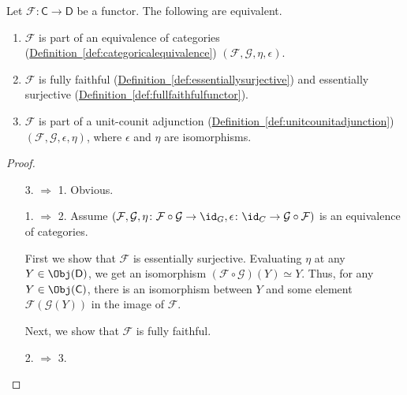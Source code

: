 \documentclass[notes.tex]{subfiles}
\begin{document}
\begin{theorem}
  Let $\mathcal{F}\colon \mathsf{C} \to \mathsf{D}$ be a functor. The following are equivalent.
  \begin{enumerate}
    \item $\mathcal{F}$ is part of an equivalence of categories (\hyperref[def:categoricalequivalence]{Definition~\ref*{def:categoricalequivalence}}) $(\mathcal{F}, \mathcal{G}, \eta, \epsilon)$.

    \item $\mathcal{F}$ is fully faithful (\hyperref[def:essentiallysurjective]{Definition~\ref*{def:essentiallysurjective}}) and essentially surjective (\hyperref[def:fullfaithfulfunctor]{Definition~\ref*{def:fullfaithfulfunctor}}).

    \item $\mathcal{F}$ is part of a unit-counit adjunction (\hyperref[def:unitcounitadjunction]{Definition~\ref*{def:unitcounitadjunction}}) $(\mathcal{F}, \mathcal{G}, \epsilon, \eta)$, where $\epsilon$ and $\eta$ are isomorphisms.
  \end{enumerate}
\end{theorem}
\begin{proof}
  \leavevmode
  \begin{enumerate}
    \item[3. $\Rightarrow$ 1.] Obvious.

    \item[1. $\Rightarrow$ 2.] Assume $(\mathcal{F}, \mathcal{G}, \eta\colon \mathcal{F} \circ \mathcal{G} \to \id_{G}, \epsilon\colon \id_{C} \to \mathcal{G} \circ \mathcal{F})$ is an equivalence of categories.

      First we show that $\mathcal{F}$ is essentially surjective. Evaluating $\eta$ at any $Y \in \Obj(\mathsf{D})$, we get an isomorphism $(\mathcal{F} \circ \mathcal{G})(Y) \simeq Y$. Thus, for any $Y \in \Obj(\mathsf{C})$, there is an isomorphism between $Y$ and some element $\mathcal{F}(\mathcal{G}(Y))$ in the image of $\mathcal{F}$.

      Next, we show that $\mathcal{F}$ is fully faithful.

    \item[2. $\Rightarrow$ 3.]
  \end{enumerate}
\end{proof}
\end{document}
